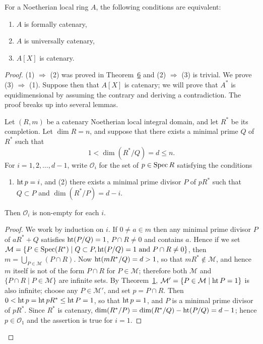 \begin{theorem}\label{thm:31.7}
For a Noetherian local ring $A$, the following conditions are equivalent:
\begin{enumerate}[(1)]
  \item $A$ is formally catenary,
  \item $A$ is universally catenary,
  \item $A[X]$ is catenary.
\end{enumerate}
\end{theorem}

\begin{proof}
(1) $\Rightarrow$ (2) was proved in Theorem~\hyperref[thm:31.6]{6} and (2) $\Rightarrow$ (3) is trivial. We
prove (3) $\Rightarrow$ (1). Suppose then that $A[X]$ is catenary; we will prove that $A^*$ is
equidimensional by assuming the contrary and deriving a contradiction. The
proof breaks up into several lemmas.

\begin{lemma}\label{lem:31.3}
Let $(R, m)$ be a catenary Noetherian local integral domain, and let $R^*$ be its
completion. Let $\dim R = n$, and suppose that there exists a minimal prime $Q$ of
$R^*$ such that
\[
  1 < \dim(R^*/Q) = d \le n.
\]
For $i = 1, 2, \ldots, d - 1$, write $\mathcal{O}_i$ for the set of $p \in \operatorname{Spec} R$ satisfying the
conditions
\begin{enumerate}[(1)]
  \item $\operatorname{ht} p = i$,
and (2) there exists a minimal prime divisor $P$ of $pR^*$ such that $Q \subset P$ and
$\dim(R^*/P) = d - i$.
\end{enumerate}
Then $\mathcal{O}_i$ is non-empty for each $i$.
\end{lemma}

\begin{proof}
We work by induction on $i$. If $0 \ne a \in m$ then any minimal prime divisor $P$ of
$aR^* + Q$ satisfies $\operatorname{ht}(P/Q) = 1$, $P \cap R \ne 0$ and contains $a$. Hence if we set
$\mathcal{M} = \{P \in \operatorname{Spec}(R^*) \mid Q \subset P, \operatorname{ht}(P/Q) = 1 \text{ and } P \cap R \ne 0\}$, then
$m = \bigcup_{P \in \mathcal{M}}(P \cap R)$. Now $\operatorname{ht}(mR^*/Q) = d > 1$, so that
$mR^* \notin \mathcal{M}$, and hence $m$ itself is not of the form $P \cap R$ for $P \in \mathcal{M}$;
therefore both $\mathcal{M}$ and $\{P \cap R \mid P \in \mathcal{M}\}$ are infinite sets. By
Theorem~\hyperref[thm:31.1]{1}, $\mathcal{M}' = \{P \in \mathcal{M} \mid \operatorname{ht} P = 1\}$ is also infinite; choose any
$P \in \mathcal{M}'$, and set $p = P \cap R$. Then $0 < \operatorname{ht} p = \operatorname{ht} pR^* \le \operatorname{ht} P = 1$, so that
$\operatorname{ht} p = 1$, and $P$ is a minimal prime divisor of $pR^*$. Since $R^*$ is catenary,
$\dim(R^*/P) = \dim(R^*/Q) - \operatorname{ht}(P/Q) = d - 1$; hence $p \in \mathcal{O}_1$ and the
assertion is true for $i = 1$.


\end{proof}
\end{proof}
